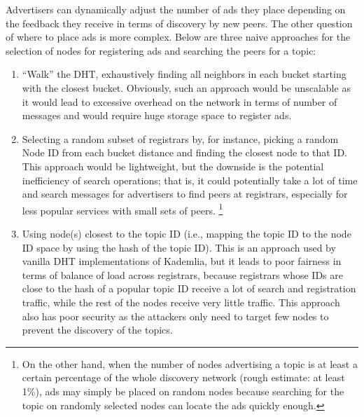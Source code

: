 Advertisers can dynamically adjust the number of ads they place depending on the feedback they receive in terms of discovery by new peers. The other question of where to place ads is more complex. Below are three naive approaches for the selection of nodes for registering ads and searching the peers for a topic:
\begin{enumerate} 
\item ``Walk'' the DHT, exhaustively finding all neighbors in each bucket starting with the closest bucket. Obviously, such an approach would be unscalable as it would lead to excessive overhead on the network in terms of number of messages and would require huge storage space to register ads.
\item Selecting a random subset of registrars by, for instance, picking a random Node ID from each bucket distance and finding the closest node to that ID.
This approach would be lightweight, but the downside is the potential inefficiency of search operations; that is, it could potentially take a lot of time and search messages for advertisers to find peers at registrars, especially for less popular services with small sets of peers.
\footnote{On the other hand, when the number of nodes advertising a topic is at least a certain percentage of the whole discovery network (rough estimate: at least 1\%), ads may simply be placed on random nodes because searching for the topic on randomly selected nodes can locate the ads quickly enough.}
\item Using node(s) closest to the topic ID (i.e., mapping the topic ID to the node ID space by using the hash of the topic ID). This is an approach used by vanilla DHT implementations of Kademlia, but it leads to poor fairness in terms of balance of load across registrars, because registrars whose IDs are close to the hash of a popular topic ID receive a lot of search and registration traffic, while the rest of the nodes receive very little traffic. This approach also has poor security as the attackers only need to target few nodes to prevent the discovery of the topics.
\end{enumerate}

